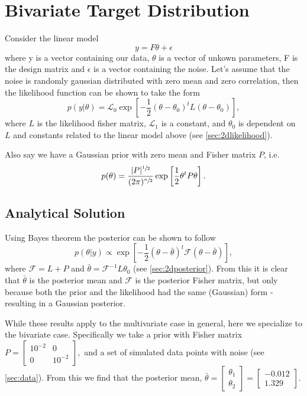 \documentclass[a4paper,11pt,twoside]{article}
\begin{document}
\section{Bivariate Target Distribution} 
Consider the linear model
\begin{equation}
	y = F\theta + \epsilon
\end{equation}
where y is a vector containing our data, $\theta$ is a vector of unkown
parameters, F is the design matrix and $\epsilon$ is a vector containing the
noise. Let's assume that the noise is randomly gaussian distributed with zero
mean and zero correlation, then the likelihood function can be shown to take the form
\begin{equation}
	p(y|\theta) = \mathcal{L}_0 \exp\left[-\frac{1}{2}(\theta - \theta_0)^tL(\theta - \theta_0)\right],
\end{equation}
where $L$ is the likelihood fisher matrix, $\mathcal{L}_1$ is a constant, and
$\theta_0$ is dependent on $L$ and constants related to the linear model above
(see \cref{sec:2dlikelihood}).

Also say we have a Gaussian prior with zero mean and Fisher matrix $P$, i.e.
\begin{equation}
	p(\theta) = \frac{|P|^{\sfrac{1}{2}}}{(2\pi)^{\sfrac{n}{2}}} \exp \left[ \frac{1}{2} \theta^t P \theta \right].
\end{equation}

\subsection{Analytical Solution}
Using Bayes theorem the posterior can be shown to follow
\begin{equation}
	p(\theta|y) \propto \exp \left[ -\frac{1}{2} (\theta - \bar{\theta})^t \mathcal{F} (\theta - \bar{\theta}) \right],
\end{equation}
where $\mathcal{F} = L + P$ and $\bar{\theta} = \mathcal{F}^{-1}L\theta_0$ (see \cref{sec:2dposterior}).
From this it is clear that $\bar{\theta}$ is the posterior mean and
$\mathcal{F}$ is the posterior Fisher matrix, but only because both the prior
and the likelihood had the same (Gaussian) form - resulting in a Gaussian
posterior.

While these results apply to the multivariate case in general, here we
specialize to the bivariate case. Specifically we take a prior with Fisher matrix
	$ P = \begin{bmatrix}
		10^{-2} & 0 \\
		0 & 10^{-2}
	\end{bmatrix}, $
and a set of simulated data points with noise (see \cref{sec:data}).
From this we find that the posterior mean, 
	$\bar{\theta} = \begin{bmatrix} 
		\theta_1 \\ 
		\theta_2 \end{bmatrix} = \begin{bmatrix} 
		-0.012 \\ 
	1.329 \end{bmatrix}$.
\end{document}
